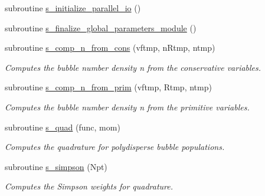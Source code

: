 \begin{DoxyCompactItemize}
subroutine \hyperlink{namespacem__global__parameters_a54905a7a2ce9e15fc33ebac52c0d3c27}{s\+\_\+initialize\+\_\+parallel\+\_\+io} ()
\item 
subroutine \hyperlink{namespacem__global__parameters_aa2237c2ed3662bbd69ef39e2e92af7bf}{s\+\_\+finalize\+\_\+global\+\_\+parameters\+\_\+module} ()
\item 
subroutine \hyperlink{namespacem__global__parameters_aac1a5a73b1eae759c913983b38047167}{s\+\_\+comp\+\_\+n\+\_\+from\+\_\+cons} (vftmp, n\+Rtmp, ntmp)
\begin{DoxyCompactList}\small\item\em Computes the bubble number density n from the conservative variables. \end{DoxyCompactList}\item 
subroutine \hyperlink{namespacem__global__parameters_acdaa3827df6fee38a3e55e8b13130c27}{s\+\_\+comp\+\_\+n\+\_\+from\+\_\+prim} (vftmp, Rtmp, ntmp)
\begin{DoxyCompactList}\small\item\em Computes the bubble number density n from the primitive variables. \end{DoxyCompactList}\item 
subroutine \hyperlink{namespacem__global__parameters_aa5a48fa9cc196136634022cfa6708213}{s\+\_\+quad} (func, mom)
\begin{DoxyCompactList}\small\item\em Computes the quadrature for polydisperse bubble populations. \end{DoxyCompactList}\item 
subroutine \hyperlink{namespacem__global__parameters_a78f4bf8bb59af4396bf11aca330463ec}{s\+\_\+simpson} (Npt)
\begin{DoxyCompactList}\small\item\em Computes the Simpson weights for quadrature. \end{DoxyCompactList}\end{DoxyCompactItemize}
